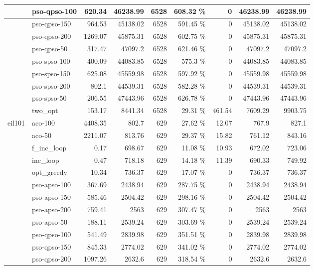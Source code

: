 \documentclass[conference]{IEEEtran}
\begin{document}
\begin{center}
\begin{longtable}[ht]{|l|l|r|r|r|r|r|r|r|}
 & pso-qpso-100 & 620.34 & 46238.99 & 6528 & 608.32 \% & 0 & 46238.99 & 46238.99 \\ \hline
 & pso-qpso-150 & 964.53 & 45138.02 & 6528 & 591.45 \% & 0 & 45138.02 & 45138.02 \\ \hline
 & pso-qpso-200 & 1269.07 & 45875.31 & 6528 & 602.75 \% & 0 & 45875.31 & 45875.31 \\ \hline
 & pso-qpso-50 & 317.47 & 47097.2 & 6528 & 621.46 \% & 0 & 47097.2 & 47097.2 \\ \hline
 & pso-spso-100 & 400.09 & 44083.85 & 6528 & 575.3 \% & 0 & 44083.85 & 44083.85 \\ \hline
 & pso-spso-150 & 625.08 & 45559.98 & 6528 & 597.92 \% & 0 & 45559.98 & 45559.98 \\ \hline
 & pso-spso-200 & 802.1 & 44539.31 & 6528 & 582.28 \% & 0 & 44539.31 & 44539.31 \\ \hline
 & pso-spso-50 & 206.55 & 47443.96 & 6528 & 626.78 \% & 0 & 47443.96 & 47443.96 \\ \hline
 & two\_opt & 153.17 & 8441.34 & 6528 & 29.31 \% & 461.54 & 7609.29 & 9903.75 \\ \hline
eil101 & aco-100 & 4408.35 & 802.7 & 629 & 27.62 \% & 12.07 & 767.9 & 827.1 \\ \hline
 & aco-50 & 2211.07 & 813.76 & 629 & 29.37 \% & 15.82 & 761.12 & 843.16 \\ \hline
 & f\_inc\_loop & 0.17 & 698.67 & 629 & 11.08 \% & 10.93 & 672.02 & 723.06 \\ \hline
 & inc\_loop & 0.47 & 718.18 & 629 & 14.18 \% & 11.39 & 690.33 & 749.92 \\ \hline
 & opt\_greedy & 10.34 & 736.37 & 629 & 17.07 \% & 0 & 736.37 & 736.37 \\ \hline
 & pso-apso-100 & 367.69 & 2438.94 & 629 & 287.75 \% & 0 & 2438.94 & 2438.94 \\ \hline
 & pso-apso-150 & 585.46 & 2504.42 & 629 & 298.16 \% & 0 & 2504.42 & 2504.42 \\ \hline
 & pso-apso-200 & 759.41 & 2563 & 629 & 307.47 \% & 0 & 2563 & 2563 \\ \hline
 & pso-apso-50 & 188.11 & 2539.24 & 629 & 303.69 \% & 0 & 2539.24 & 2539.24 \\ \hline
 & pso-qpso-100 & 541.49 & 2839.98 & 629 & 351.51 \% & 0 & 2839.98 & 2839.98 \\ \hline
 & pso-qpso-150 & 845.33 & 2774.02 & 629 & 341.02 \% & 0 & 2774.02 & 2774.02 \\ \hline
 & pso-qpso-200 & 1097.26 & 2632.6 & 629 & 318.54 \% & 0 & 2632.6 & 2632.6 \\ \hline

\end{longtable}
\end{center}
\end{document}
